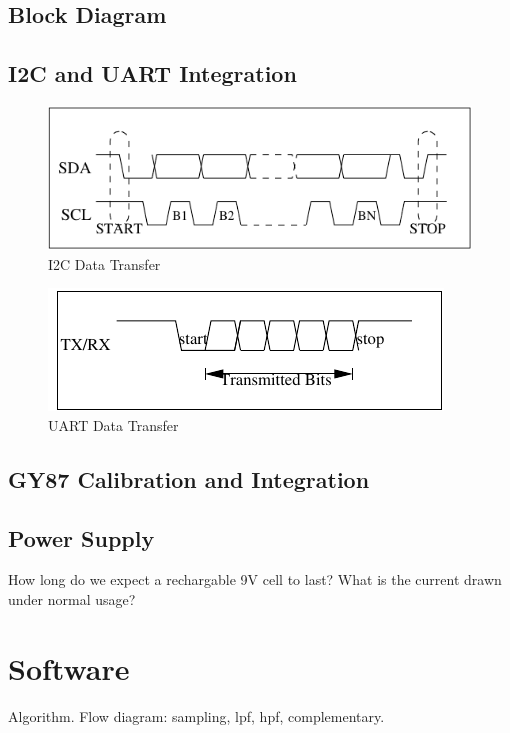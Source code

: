 \documentclass[11pt, a4paper]{article}
\begin{document}
\subsection{Block Diagram}

\subsection{I2C and UART Integration}
\begin{figure}
    \centering
    \includegraphics[width=\linewidth]{I2C_Timing.pdf}
    \caption{I2C Data Transfer}
    \label{fig:i2c_timing}
\end{figure}

\begin{figure}
    \centering
    \includegraphics[width=\linewidth]{UART_Timing.pdf}
    \caption{UART Data Transfer}
    \label{fig:uart_timing}
\end{figure}

\subsection{GY87 Calibration and Integration}

\subsection{Power Supply}
How long do we expect a rechargable 9V cell to last? What is the current
drawn under normal usage?

\section{Software}
Algorithm.
Flow diagram: sampling, lpf, hpf, complementary.
\end{document}

